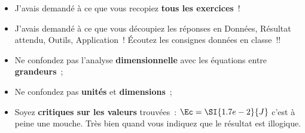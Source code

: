 \documentclass[a4paper, 11pt, final, garamond]{book}
\begin{document}
\begin{itemize}
	\item J'avais demandé à ce que vous recopiez \textbf{tous les exercices}~!
	\item J'avais demandé à ce que vous découpiez les réponses en Données,
	      Résultat attendu, Outils, Application~! Écoutez les consignes données en
	      classe~!!
	\item Ne confondez pas l'analyse \textbf{dimensionnelle} avec les équations
	      entre \textbf{grandeurs}~;
	\item Ne confondez pas \textbf{unités} et \textbf{dimensions}~;
	\item Soyez \textbf{critiques sur les valeurs} trouvées~: $\Ec =
		      \SI{1.7e-2}{J}$ c'est à peine une mouche. Très bien quand vous
	      indiquez que le résultat est illogique.
\end{itemize}
\end{document}
